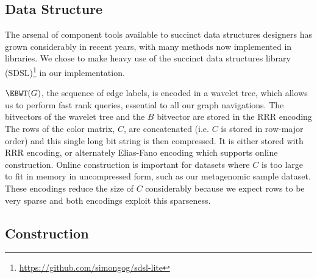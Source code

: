 \subsection{Data Structure}

The arsenal of component tools available to succinct data structures designers has grown considerably in recent years, with many methods now implemented in libraries. We chose to make heavy use of the succinct data structures library (SDSL)\footnote{\url{https://github.com/simongog/sdsl-lite}} 
in our implementation.

\(\EBWT (G)\), the sequence of edge labels, is encoded in a wavelet tree, which allows us to perform fast rank queries, essential to all our graph navigations. The bitvectors of the wavelet tree  and the $B$ bitvector are stored in the RRR encoding
The rows of the color matrix, $C$, are concatenated (i.e. $C$ is stored in row-major order) and this single long bit string is then compressed.  It is either stored with RRR encoding,  or alternately Elias-Fano encoding which supports online construction.  Online construction is important for datasets where $C$ is too large to fit in memory in uncompressed form, such as our metagenomic sample dataset.  These encodings reduce the size of $C$ considerably because we expect rows to be very sparse
and both encodings exploit this sparseness. 

\subsection{Construction}

